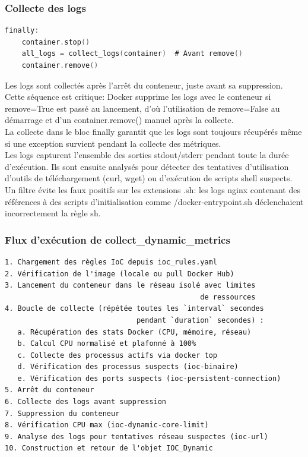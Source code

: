 \subsubsection{Collecte des logs}
\begin{lstlisting}[language=go, caption=Collecte des logs]
finally:
    container.stop()
    all_logs = collect_logs(container)  # Avant remove()
    container.remove()
\end{lstlisting}
Les logs sont collectés après l'arrêt du conteneur, juste avant sa suppression. Cette séquence est critique: Docker supprime les logs avec le conteneur si remove=True est passé au lancement, d'où l'utilisation de remove=False au démarrage et d'un container.remove() manuel après la collecte. \\

La collecte dans le bloc finally garantit que les logs sont toujours récupérés même si une exception survient pendant la collecte des métriques. \\

Les logs capturent l'ensemble des sorties stdout/stderr pendant toute la durée d'exécution. Ils sont ensuite analysés pour détecter des tentatives d'utilisation d'outils de téléchargement (curl, wget) ou d'exécution de scripts shell suspects. Un filtre évite les faux positifs sur les extensions .sh: les logs nginx contenant des références à des scripts d'initialisation comme /docker-entrypoint.sh déclenchaient incorrectement la règle sh. \\

\subsubsection{Flux d'exécution de collect\_dynamic\_metrics}
\begin{lstlisting}[caption=Collecte des metriques]
1. Chargement des règles IoC depuis ioc_rules.yaml
2. Vérification de l'image (locale ou pull Docker Hub)
3. Lancement du conteneur dans le réseau isolé avec limites 
                                              de ressources
4. Boucle de collecte (répétée toutes les `interval` secondes 
                               pendant `duration` secondes) :
   a. Récupération des stats Docker (CPU, mémoire, réseau)
   b. Calcul CPU normalisé et plafonné à 100%
   c. Collecte des processus actifs via docker top
   d. Vérification des processus suspects (ioc-binaire)
   e. Vérification des ports suspects (ioc-persistent-connection)
5. Arrêt du conteneur
6. Collecte des logs avant suppression
7. Suppression du conteneur
8. Vérification CPU max (ioc-dynamic-core-limit)
9. Analyse des logs pour tentatives réseau suspectes (ioc-url)
10. Construction et retour de l'objet IOC_Dynamic
\end{lstlisting}

